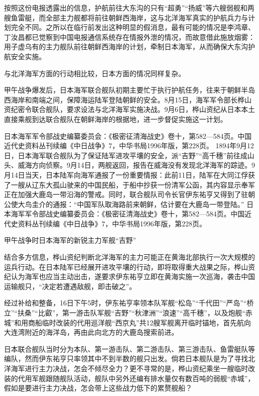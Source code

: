 \documentclass[12pt,UTF8]{ctexbook}
\begin{document}
按照这份电报透露出的信息，护航前往大东沟的只有“超勇”“扬威”等六艘弱舰和两艘鱼雷艇，而全部主力舰都将前往朝鲜西海岸，这与北洋海军真实的护航兵力与计划完全不同。之所以在临行前发出这种明显的假消息，最有可能的情况是李鸿章、丁汝昌都已觉察到中国电报通信系统存在情报外泄的情况，而故意借此施放烟雾：用子虚乌有的主力舰队前往朝鲜西海岸的计划，牵制日本海军，从而确保大东沟护航安全实施。

与北洋海军方面的行动相比较，日本方面的情况同样复杂。

甲午战争爆发后，日本海军联合舰队初期主要忙于执行护航任务，往来于朝鲜半岛西海岸和南端之间，保障海运陆军登陆朝鲜的安全。8月15日，海军军令部长桦山资纪密令联合舰队，要求设法与北洋海军实施决战。9月6日，桦山资纪从日本本土直接乘舰到达联合舰队在朝鲜海岸的根据地，进一步督促实施这一计划。

日本海军军令部战史编纂委员会：《极密征清海战史》卷十，第582—584页。中国近代史资料丛刊续编《中日战争》7，中华书局1996年版，第228页。
1894年9月12日，日本海军联合舰队为了保证陆军进攻平壤的安全，派“吉野”“高千穗”前往成山头、威海方向侦察。9月14日，两舰返回，报告在威海没有发现北洋海军的踪迹。9月14日当天，日本陆军向海军通报了一份重要情报：此前11日，陆军在大同江俘获了一艘从辽东大孤山驶来的中国民船，于船中抄获一份清军公函，其内容显示奉军正在加强大鹿岛一带沿海的警戒。同时，联合舰队司令长官伊东祐亨又得到了驻朝公使大鸟圭介的通报：“中国军队取海路前来朝鲜，估计要在大鹿岛一带登陆。” 日本海军军令部战史编纂委员会：《极密征清海战史》卷十，第582—584页。中国近代史资料丛刊续编《中日战争》7，中华书局1996年版，第228页。


甲午战争时日本海军的新锐主力军舰“吉野”

结合多方信息，桦山资纪判断北洋海军的主力可能正在黄海北部执行一次大规模的运兵行动。在日本陆军已经展开进攻平壤的行动，即将取得重大战果之际，桦山资纪认为海军也应当主动出击，遂要求伊东祐亨立即在黄海实施一次巡海，袭击中国运输舰只，“决定若遭遇敌舰，即击破之”。

经过补给和整备，16日下午5时，伊东祐亨率领本队军舰“松岛”“千代田”“严岛”“桥立”“扶桑”“比叡”，第一游击队军舰“吉野”“秋津洲”“浪速”“高千穗”，以及炮舰“赤城”和用商船临时改装的代用巡洋舰“西京丸”共12艘军舰离开临时锚地，首先航向大连湾附近的海洋岛，再由此向北方的大鹿岛搜索前进。

日本联合舰队当时分为本队、第一游击队、第二游击队、第三游击队、鱼雷艇队等编队，然而伊东祐亨只率领其中不到半数的舰只出发。倘若日本舰队是为了寻找北洋海军进行主力决战，怎会不倾尽全力？更不寻常的是，桦山资纪乘坐一艘临时改装的代用军舰跟随舰队活动，舰队中另外还编有排水量仅有数百吨的弱舰“赤城”，假如是要进行主力决战，怎会带上这些战力低下的累赘舰船？
\end{document}

